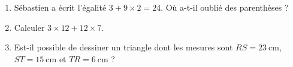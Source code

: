 
\begin{exercice}\label{exosmath-0847}

    \begin{enumerate}
        \item
            Sébastien a écrit l'égalité \( 3+9\times 2=24\). Où a-t-il oublié des parenthèses ?
        \item
            Calculer \( 3\times 12+12\times 7\). 
        \item
            Est-il possible de dessiner un triangle dont les mesures sont \( RS=\SI{23}{\centi\meter}\), \( ST=\SI{15}{\centi\meter}\) et \( TR=\SI{6}{\centi\meter}\) ?
    \end{enumerate}

\end{exercice}
